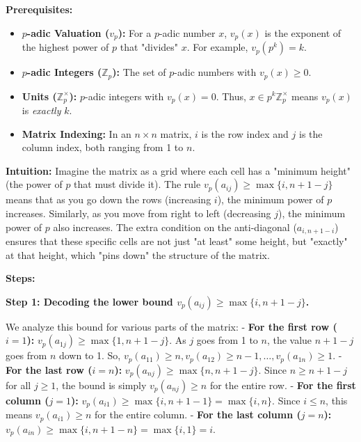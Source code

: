 \begin{solution}
\textbf{Prerequisites:}
\begin{itemize}
    \item \textbf{$p$-adic Valuation ($v_p$):} For a $p$-adic number $x$, $v_p(x)$ is the exponent of the highest power of $p$ that "divides" $x$. For example, $v_p(p^k) = k$.
    \item \textbf{$p$-adic Integers ($\mathbb{Z}_p$):} The set of $p$-adic numbers with $v_p(x) \geq 0$.
    \item \textbf{Units ($\mathbb{Z}_p^\times$):} $p$-adic integers with $v_p(x) = 0$. Thus, $x \in p^k \mathbb{Z}_p^\times$ means $v_p(x)$ is \textit{exactly} $k$.
    \item \textbf{Matrix Indexing:} In an $n \times n$ matrix, $i$ is the row index and $j$ is the column index, both ranging from 1 to $n$.
\end{itemize}

\bigskip

\textbf{Intuition:}
Imagine the matrix as a grid where each cell has a "minimum height" (the power of $p$ that must divide it). The rule $v_p(a_{ij}) \geq \max\{i, n+1-j\}$ means that as you go down the rows (increasing $i$), the minimum power of $p$ increases. Similarly, as you move from right to left (decreasing $j$), the minimum power of $p$ also increases. The extra condition on the anti-diagonal ($a_{i, n+1-i}$) ensures that these specific cells are not just "at least" some height, but "exactly" at that height, which "pins down" the structure of the matrix.

\bigskip

\textbf{Steps:}

\textbf{Step 1: Decoding the lower bound $v_p(a_{ij}) \geq \max\{i, n+1-j\}$.}

We analyze this bound for various parts of the matrix:
- \textbf{For the first row ($i=1$):} $v_p(a_{1j}) \geq \max\{1, n+1-j\}$. As $j$ goes from 1 to $n$, the value $n+1-j$ goes from $n$ down to 1. So, $v_p(a_{11}) \geq n, v_p(a_{12}) \geq n-1, \dots, v_p(a_{1n}) \geq 1$.
- \textbf{For the last row ($i=n$):} $v_p(a_{nj}) \geq \max\{n, n+1-j\}$. Since $n \geq n+1-j$ for all $j \geq 1$, the bound is simply $v_p(a_{nj}) \geq n$ for the entire row.
- \textbf{For the first column ($j=1$):} $v_p(a_{i1}) \geq \max\{i, n+1-1\} = \max\{i, n\}$. Since $i \leq n$, this means $v_p(a_{i1}) \geq n$ for the entire column.
- \textbf{For the last column ($j=n$):} $v_p(a_{in}) \geq \max\{i, n+1-n\} = \max\{i, 1\} = i$.


\end{solution}
